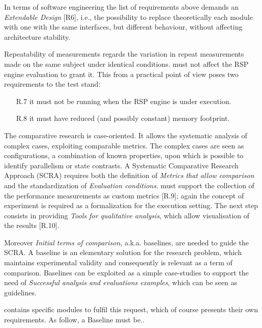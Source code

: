 In terms of software engineering the list of requirements above demands an \textit{Extendable Design} [R6], i.e.,  the possibility to replace theoretically each module with one with the same interfaces, but different behaviour, without affecting architecture stability.

Repeatability of measurements regards the variation in repeat measurements made on the same subject under identical conditions. \name must not affect the RSP engine evaluation to grant it. This from a practical point of view poses two requirements to the test stand:
\begin{enumerate}
\item[R.7] it must not be running when the RSP engine is under execution. %
\item[R.8] it must have reduced (and possibly constant) memory footprint. %
\end{enumerate}

The comparative research is case-oriented. It allows the systematic analysis of complex cases, exploiting comparable metrics. The complex cases are seen as configurations, a combination of known properties, upon which is possible to identify parallelism or state contrasts. A Systematic Comparative Research Approach (SCRA) requires both the definition of \textit{Metrics that allow comparison} and the standardization of \textit{Evaluation conditions}.  \name must support the collection of the performance measurements as custom metrics [R.9]; again the concept of experiment is required as a formalization for the execution setting. The next step consists in providing \textit{Tools for qualitative analysis}, which allow visualisation of the results [R.10].

Moreover \textit{Initial terms of comparison}, a.k.a. baselines, are needed to guide the SCRA. A baseline is an elementary solution for the research problem, which maintains experimental validity and consequently is relevant as a term of comparison. Baselines can be exploited as a simple case-studies to support the need of \textit{Successful analysis and evaluations examples}, which can be seen as guidelines.

\name contains specific modules to fulfil this request, which of course presents their own requirements. As follow, a Baseline must be.. 

